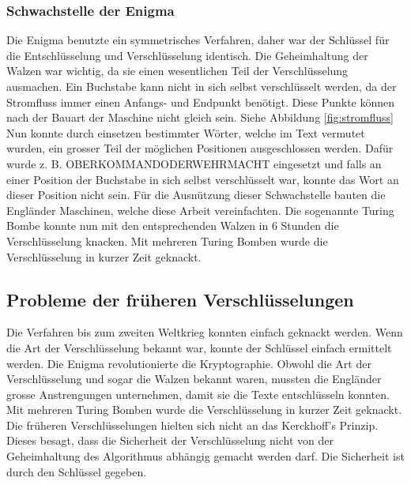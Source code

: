 \subsubsection{Schwachstelle der Enigma}
Die Enigma benutzte ein symmetrisches Verfahren, daher war der Schlüssel für die Entschlüsselung und Verschlüsselung identisch. %
Die Geheimhaltung der Walzen war wichtig, da sie einen wesentlichen Teil der Verschlüsselung ausmachen.
Ein Buchstabe kann nicht in sich selbst verschlüsselt werden, da der Stromfluss immer einen Anfangs- und Endpunkt benötigt. Diese Punkte können nach der Bauart der Maschine nicht gleich sein. Siehe Abbildung \ref{fig:stromfluss}
Nun konnte durch einsetzen bestimmter Wörter, welche im Text vermutet wurden, ein grosser Teil der möglichen Positionen ausgeschlossen werden. Dafür wurde z. B. OBERKOMMANDODERWEHRMACHT eingesetzt und falls an einer Position der Buchstabe in sich selbst verschlüsselt war, konnte das Wort an dieser Position nicht sein. Für die Ausnützung dieser Schwachstelle bauten die Engländer Maschinen, welche diese Arbeit vereinfachten. Die sogenannte Turing Bombe konnte nun mit den entsprechenden Walzen in 6 Stunden die Verschlüsselung knacken. 
Mit mehreren Turing Bomben wurde die Verschlüsselung in kurzer Zeit geknackt. 
%
\subsection{Probleme der früheren Verschlüsselungen}
Die Verfahren bis zum zweiten Weltkrieg konnten einfach geknackt werden. Wenn die Art der Verschlüsselung bekannt war, konnte der Schlüssel einfach ermittelt werden. 
Die Enigma revolutionierte die Kryptographie. Obwohl die Art der Verschlüsselung und sogar die Walzen bekannt waren, mussten die Engländer grosse Anstrengungen unternehmen, damit sie die Texte entschlüsseln konnten. \\[2ex]
Mit mehreren Turing Bomben wurde die Verschlüsselung in kurzer Zeit geknackt. \\[2ex]
%
Die früheren Verschlüsselungen hielten sich nicht an das Kerckhoff's Prinzip. Dieses besagt, dass die Sicherheit der Verschlüsselung nicht von der Geheimhaltung des Algorithmus abhängig gemacht werden darf. Die Sicherheit ist durch den Schlüssel gegeben. \cite{kerckhoffsprinzip}
%